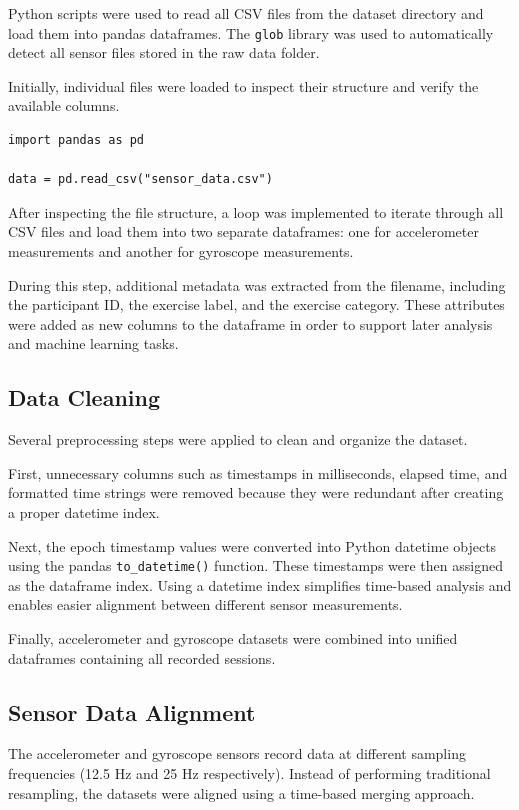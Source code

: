 \documentclass[12pt,a4paper]{article}
\begin{document}
Python scripts were used to read all CSV files from the dataset directory and load them into pandas dataframes. The \texttt{glob} library was used to automatically detect all sensor files stored in the raw data folder.

Initially, individual files were loaded to inspect their structure and verify the available columns.

\begin{lstlisting}
import pandas as pd

data = pd.read_csv("sensor_data.csv")
\end{lstlisting}

After inspecting the file structure, a loop was implemented to iterate through all CSV files and load them into two separate dataframes: one for accelerometer measurements and another for gyroscope measurements.

During this step, additional metadata was extracted from the filename, including the participant ID, the exercise label, and the exercise category. These attributes were added as new columns to the dataframe in order to support later analysis and machine learning tasks.

\subsection{Data Cleaning}

Several preprocessing steps were applied to clean and organize the dataset.

First, unnecessary columns such as timestamps in milliseconds, elapsed time, and formatted time strings were removed because they were redundant after creating a proper datetime index.

Next, the epoch timestamp values were converted into Python datetime objects using the pandas \texttt{to\_datetime()} function. These timestamps were then assigned as the dataframe index. Using a datetime index simplifies time-based analysis and enables easier alignment between different sensor measurements.

Finally, accelerometer and gyroscope datasets were combined into unified dataframes containing all recorded sessions.

\subsection{Sensor Data Alignment}

The accelerometer and gyroscope sensors record data at different sampling frequencies (12.5 Hz and 25 Hz respectively). Instead of performing traditional resampling, the datasets were aligned using a time-based merging approach.
\end{document}
